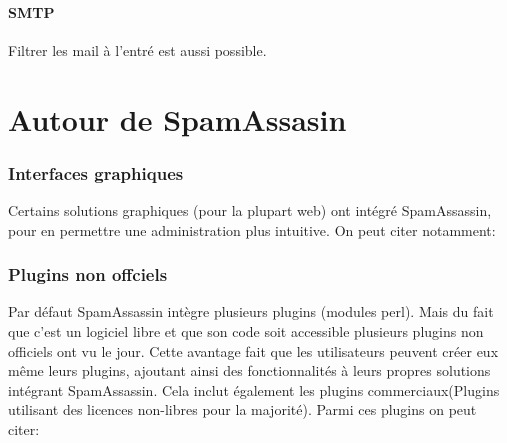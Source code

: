 \documentclass[a4paper,11pt]{article}
\begin{document}
\subsection{SMTP}

Filtrer les mail à l'entré est aussi possible. 
        

\part{Autour de SpamAssasin}

\section{Interfaces graphiques}

Certains solutions graphiques (pour la plupart web) ont intégré SpamAssassin, pour en permettre une administration plus intuitive.
On peut citer notamment:
\begin{description}
 \item 
\end{description}


\section{Plugins non offciels}

Par défaut SpamAssassin intègre plusieurs plugins (modules perl). Mais du fait que c'est un logiciel libre et que son code soit accessible plusieurs
plugins non officiels ont vu le jour. Cette avantage fait que les utilisateurs peuvent créer eux même leurs plugins,
ajoutant ainsi des fonctionnalités à leurs propres solutions intégrant SpamAssassin. Cela inclut également les plugins commerciaux(Plugins utilisant des licences non-libres pour la majorité). 
Parmi ces plugins on peut citer:
\end{document}
